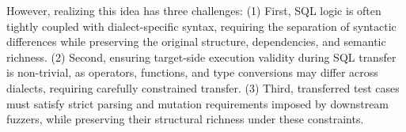 \documentclass[conference]{IEEEtran}
\begin{document}


However, realizing this idea has three challenges:
(1) First, SQL logic is often tightly coupled with dialect-specific syntax, requiring the separation of syntactic differences while preserving the original structure, dependencies, and semantic richness.
(2) Second, ensuring target-side execution validity during SQL transfer is non-trivial, as operators, functions, and type conversions may differ across dialects, requiring carefully constrained transfer.
(3) Third, transferred test cases must satisfy strict parsing and mutation requirements imposed by downstream fuzzers, while preserving their structural richness under these constraints.



\end{document}

